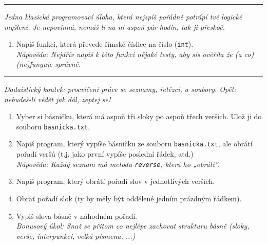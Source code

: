 \documentclass[a4paper,10pt]{article}
\newcommand\startsection[1]{
     \vspace{0.2ex}
    \hrule
    {\fontspec{Oxygen} \tiny
     \vspace{-1ex}
     \emph{#1}
     \vspace{-1.5em}
    }
}
\begin{document}

\startsection{Jedna klasická programovací úloha, která nejspíš pořádně potrápí
    tvé logické myšlení. Je nepovinná, nemáš-li na ni aspoň pár hodin,
    tak ji přeskoč.}

\begin{enumerate}[resume]

\item Napiš funkci, která převede římské číslice na číslo (\verb+int+).
    \\\emph{Nápověda: Nejdřív napiš k této funkci nějaké testy, aby sis
        ověřila že (a co) (ne)funguje správně.}

\end{enumerate}

\startsection{Dadaistický koutek: procvičení práce se seznamy, řetězci,
    a soubory. Opět: nebudeš-li vědět jak dál, zeptej se!}

\begin{enumerate}[resume]

\item Vyber si básničku, která má aspoň tři sloky po aspoň třech verších.
    Ulož ji do souboru \verb+basnicka.txt+,

\item Napiš program, který vypíše básničku ze souboru \verb+basnicka.txt+,
    ale obrátí pořadí veršů (t.j. jako první vypíše poslední řádek, atd.)
    \\\emph{Nápověda: Každý seznam má metodu \texttt{reverse}, která ho „obrátí”.}

\item Napiš program, který obrátí pořadí slov v jednotlivých verších.

\item Obrať pořadí slok (ty by měly být oddělené jedním prázdným řádkem).

\item Vypiš slova básně v náhodném pořadí.
    \\\emph{Bonusový úkol: Snaž se přitom co nejlépe zachovat strukturu básně
        (sloky, verše, interpunkci, velká písmena, ...)}

\end{enumerate}
\end{document}
